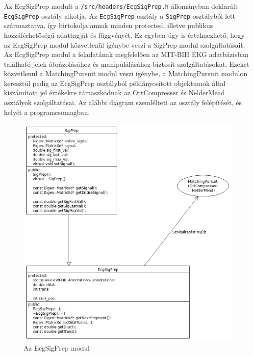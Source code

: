 \documentclass[oneside,titlepage,12pt,a4paper]{report}
\begin{document}
\par Az EcgSigPrep modult a \texttt{/src/headers/EcgSigPrep.h} állományban deklarált \linebreak \texttt{EcgSigPrep} osztály alkotja. Az \texttt{EcgSigPrep} osztály a \texttt{SigPrep} osztályból lett származtatva, így birtokolja annak minden protected, illetve publikus hozzáférhetőségű adattagját és függvényét. Ez egyben úgy is értelmezhető, hogy az EcgSigPrep modul közvetlenül igénybe veszi a SigPrep modul szolgáltatásait. Az EcgSigPrep modul a feladatának megfelelően az MIT-BIH EKG adatbázisban található jelek ábrázolásához és manipulálásához biztosít szolgáltatásokat. Ezeket közvetlenül a MatchingPursuit modul veszi igénybe, a MatchingPursuit modulon keresztül pedig az EcgSigPrep osztályból példányosított objektumok által kiszámított jel értékekre támaszkodnak az OrtCompresser és NelderMead osztályok szolgáltatásai. Az alábbi diagram szemlélteti az osztály felépítését, és helyét a programcsomagban.

\begin{figure}[H] \label{ecgSigPrepUML}
\begin{center}
  \includegraphics[width=150mm]{./Abrak/UML/EcgSigPrep.png}
  \caption{Az EcgSigPrep modul}
\end{center}
\end{figure} 
\end{document}
